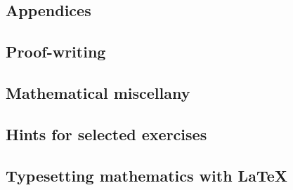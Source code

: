\documentclass[10pt]{book}
\begin{document}

\appendix
\begin{appendices}
\renewcommand{\sectionmark}[1]{\markboth{\leftmark}{Section \thesection.\ #1}}
\renewcommand{\chaptermark}[1]{\markboth{Appendix \thechapter.\ #1}{\rightmark}}

\part*{Appendices}

\chapter{Proof-writing}
    \label{apxWriting}
    \renewcommand\chaptername{Proof-writing}
    

\chapter{Mathematical miscellany}    
    \label{apxMiscellany}
    \renewcommand\chaptername{Mathematical miscellany}
    

\chapter{Hints for selected exercises}
    \label{apxHints}
    \renewcommand\chaptername{Hints to selected exercises}
    

\chapter{Typesetting mathematics with \LaTeX{}}
    \label{apxLaTeX}
    \renewcommand\chaptername{Typesetting mathematics with \LaTeX{}}
    

\end{appendices}

\backmatter
\end{document}
